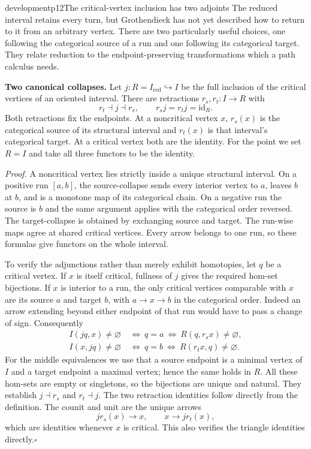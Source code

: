 \begin{dcomment}{development}{p12}{The critical-vertex inclusion has two adjoints}
The reduced interval retains every turn, but Grothendieck has not yet described how to return to it from an arbitrary vertex. There are two particularly useful choices, one following the categorical source of a run and one following its categorical target. They relate reduction to the endpoint-preserving transformations which a path calculus needs.

\textbf{Two canonical collapses.}\ours{}
Let $j:R=I_{\mathrm{red}}\hookrightarrow I$ be the full inclusion of the critical vertices of an oriented interval. There are retractions $r_s,r_t:I\to R$ with
\[
 r_t\dashv j\dashv r_s,\qquad
 r_sj=r_tj=\mathrm{id}_R.
\]
Both retractions fix the endpoints. At a noncritical vertex $x$, $r_s(x)$ is the categorical source of its structural interval and $r_t(x)$ is that interval's categorical target. At a critical vertex both are the identity. For the point we set $R=I$ and take all three functors to be the identity.

\emph{Proof.} A noncritical vertex lies strictly inside a unique structural interval. On a positive run $[a,b]$, the source-collapse sends every interior vertex to $a$, leaves $b$ at $b$, and is a monotone map of its categorical chain. On a negative run the source is $b$ and the same argument applies with the categorical order reversed. The target-collapse is obtained by exchanging source and target. The run-wise maps agree at shared critical vertices. Every arrow belongs to one run, so these formulas give functors on the whole interval.

To verify the adjunctions rather than merely exhibit homotopies, let $q$ be a critical vertex. If $x$ is itself critical, fullness of $j$ gives the required hom-set bijections. If $x$ is interior to a run, the only critical vertices comparable with $x$ are its source $a$ and target $b$, with $a\to x\to b$ in the categorical order. Indeed an arrow extending beyond either endpoint of that run would have to pass a change of sign. Consequently
\[
\begin{split}
 I(jq,x)\ne\varnothing&\ \Longleftrightarrow\ q=a
     \ \Longleftrightarrow\ R(q,r_sx)\ne\varnothing,\\
 I(x,jq)\ne\varnothing&\ \Longleftrightarrow\ q=b
     \ \Longleftrightarrow\ R(r_tx,q)\ne\varnothing.
\end{split}
\]
For the middle equivalences we use that a source endpoint is a minimal vertex of $I$ and a target endpoint a maximal vertex; hence the same holds in $R$. All these hom-sets are empty or singletons, so the bijections are unique and natural. They establish $j\dashv r_s$ and $r_t\dashv j$. The two retraction identities follow directly from the definition. The counit and unit are the unique arrows
\[
 j r_s(x)\longrightarrow x,\qquad x\longrightarrow j r_t(x),
\]
which are identities whenever $x$ is critical. This also verifies the triangle identities directly.\hfill$\square$


\end{dcomment}
